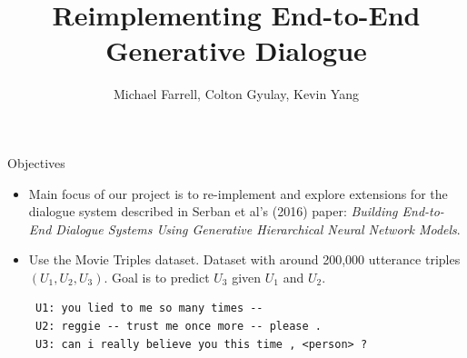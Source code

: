 \documentclass{beamer}
\title{ Reimplementing End-to-End Generative Dialogue }
\author{Michael Farrell, Colton Gyulay, Kevin Yang}
\begin{document}
\begin{frame}
  \titlepage
\end{frame}

\begin{frame}[fragile]{Objectives}

\begin{itemize}
\item Main focus of our project is to re-implement and explore extensions for the dialogue system described in Serban et al's (2016) paper: \textit{Building End-to-End Dialogue Systems Using Generative Hierarchical Neural Network Models}. 
\item Use the Movie Triples dataset. Dataset with around 200,000 utterance triples $(U_1, U_2, U_3)$. Goal is to predict $U_3$ given $U_1$ and $U_2$. \\
 \begin{verbatim} 
 U1: you lied to me so many times -- 
 U2: reggie -- trust me once more -- please . 
 U3: can i really believe you this time , <person> ? 
 \end{verbatim}
 \end{itemize}
\end{frame}
\end{document}
